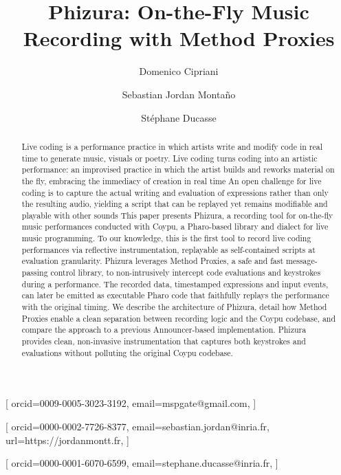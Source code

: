 \documentclass[
]{ceurart}
\begin{document}


\title{Phizura: On-the-Fly Music Recording with Method Proxies}



\author[1]{Domenico Cipriani}[%
orcid=0009-0005-3023-3192,
email=mspgate@gmail.com,
]


\author[1]{Sebastian {Jordan Montaño}}[%
orcid=0000-0002-7726-8377,
email=sebastian.jordan@inria.fr,
url=https://jordanmontt.fr,
]

\author[1]{Stéphane Ducasse}[
orcid=0000-0001-6070-6599,
email=stephane.ducasse@inria.fr,
]

\address[1]{Univ. Lille, Inria, CNRS, Centrale Lille, UMR 9189 CRIStAL, Park Plaza, Parc scientifique de la Haute-Borne, 40 Av. Halley Bât A, 59650 Villeneuve-d’Ascq, France}


\begin{abstract}
Live coding is a performance practice in which artists write and modify code in real time to generate music, visuals or poetry. Live coding turns coding into an artistic performance: an improvised practice in which the artist builds and reworks material on the fly, embracing the immediacy of creation in real time
An open challenge for live coding is to capture the actual writing and evaluation of expressions rather than only the resulting audio, yielding a script that can be replayed yet remains modifiable and playable with other sounds
This paper presents Phizura, a recording tool for on-the-fly music performances conducted with Coypu, a Pharo-based library and dialect for live music programming. To our knowledge, this is the first tool to record live coding performances via reflective instrumentation, replayable as self-contained scripts at evaluation granularity.
Phizura leverages Method Proxies, a safe and fast message-passing control library, to non-intrusively intercept code evaluations and keystrokes during a performance.
The recorded data, timestamped expressions and input events, can later be emitted as executable Pharo code that faithfully replays the performance with the original timing.
We describe the architecture of Phizura, detail how Method Proxies enable a clean separation between recording logic and the Coypu codebase, and compare the approach to a previous Announcer-based implementation. Phizura provides clean, non-invasive instrumentation that captures both keystrokes and evaluations without polluting the original Coypu codebase.
\end{abstract}
\end{document}
